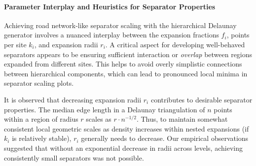 \paragraph{Parameter Interplay and Heuristics for Separator Properties}
Achieving road network-like separator scaling with the hierarchical Delaunay generator involves a nuanced interplay between the expansion fractions \(f_i\), points per site \(k_i\), and expansion radii \(r_i\).
A critical aspect for developing well-behaved separators appears to be ensuring sufficient interaction or \emph{overlap} between regions expanded from different sites.
This helps to avoid overly simplistic connections between hierarchical components, which can lead to pronounced local minima in separator scaling plots.

It is observed that decreasing expansion radii \(r_i\) contributes to desirable separator properties.
The median edge length in a Delaunay triangulation of \(n\) points within a region of radius \(r\) scales as \(r \cdot n^{-1/2}\).
Thus, to maintain somewhat consistent local geometric scales as density increases within nested expansions (if \(k_i\) is relatively stable), \(r_i\) generally needs to decrease.
Our empirical observations suggested that without an exponential decrease in radii across levels, achieving consistently small separators was not possible.

